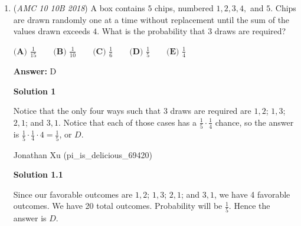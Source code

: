 \begin{enumerate}
 



\textbf{Solution 4}

Total subsets is $(2^8) = 256$ Using complementary counting and finding the sets with composite numbers:only 4,6,8 and 9 are composite. Each one can be either in the set or out:$2^4$ = 16$256-16=240$$\boxed{\textbf{(D) }240}$

 -goldenn

 



\textbf{Solution 5}

We multiply the number of possibilities of the set having prime numbers and the set having composites.

 The possibilities of primes are $2^4-1=15$ (As there is one solution not containing any primes)

 The possibilities of the set containing composites are $2^4=16$ (There can be a set with no composites)

 Multiplying this we get $15 \cdot 16 = \boxed{\textbf{(D) }240}$. 

 -middletonkids

 


 


	\item (\textit{AMC 10 10B 2018}) A box contains $5$ chips, numbered $1, 2, 3, 4,$ and $5$. Chips are drawn randomly one at a time without replacement until the sum of the values drawn exceeds $4$. What is the probability that $3$ draws are required?


 $\textbf{(A) }\frac{1}{15} \qquad \textbf{(B) }\frac{1}{10} \qquad \textbf{(C) }\frac{1}{6} \qquad \textbf{(D) }\frac{1}{5} \qquad \textbf{(E) }\frac{1}{4} \qquad$

 \textbf{Answer: }D



\textbf{Solution 1}

Notice that the only four ways such that $3$ draws are required are $1,2$; $1,3$; $2,1$; and $3,1$. Notice that each of those cases has a $\frac{1}{5} \cdot \frac{1}{4}$ chance, so the answer is $\frac{1}{5} \cdot \frac{1}{4} \cdot 4 = \frac{1}{5}$, or $\boxed{D}$.

 Jonathan Xu (pi\_is\_delicious\_69420)

 



\textbf{Solution 1.1}

Since our favorable outcomes are $1,2$; $1,3$; $2,1$; and $3,1$, we have 4 favorable outcomes. We have 20 total outcomes. Probability will be  $\frac{1}{5}$. Hence the answer is $\boxed{D}$.


\end{enumerate}
